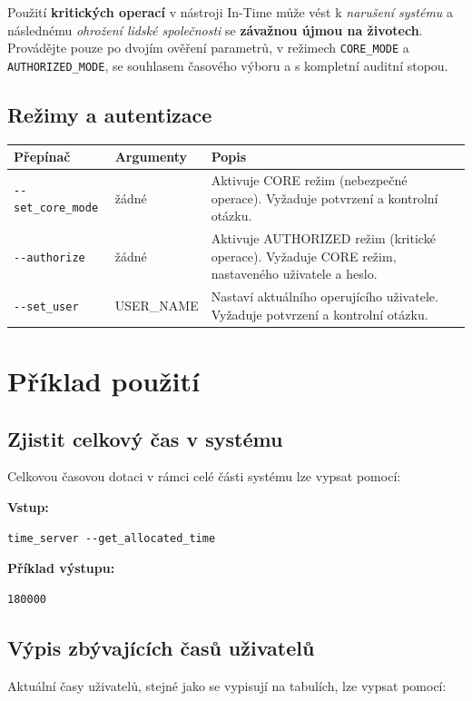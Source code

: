 \documentclass[11pt,a4paper]{book}
\begin{document}
\begin{caja}[title=Varování]
Použití \textbf{kritických operací} v nástroji In-Time může vést k \emph{narušení systému}
a následnému \emph{ohrožení lidské společnosti} se \textbf{závažnou újmou na životech}.
Provádějte pouze po dvojím ověření parametrů, v režimech \texttt{CORE\_MODE} a
\texttt{AUTHORIZED\_MODE}, se souhlasem časového výboru a s kompletní auditní stopou.
\end{caja}

\section{Režimy a autentizace}
\begin{longtable}{@{}llp{9cm}@{}}
\toprule
\textbf{Přepínač} & \textbf{Argumenty} & \textbf{Popis} \\
\midrule
\texttt{{-}-set\_core\_mode} & žádné & Aktivuje CORE režim (nebezpečné operace). Vyžaduje potvrzení a kontrolní otázku. \\
\texttt{{-}-authorize} & žádné & Aktivuje AUTHORIZED režim (kritické operace). Vyžaduje CORE režim, nastaveného uživatele a heslo. \\
\texttt{{-}-set\_user} & USER\_NAME & Nastaví aktuálního operujícího uživatele. Vyžaduje potvrzení a kontrolní otázku. \\
\bottomrule
\end{longtable}

\chapter{Příklad použití}

\section{Zjistit celkový čas v systému}
Celkovou časovou dotaci v rámci celé části systému lze vypsat pomocí:

\textbf{Vstup:}
\begin{verbatim}
time_server --get_allocated_time
\end{verbatim}

\textbf{Příklad výstupu:}
\begin{verbatim}
180000
\end{verbatim}

\section{Výpis zbývajících časů uživatelů}
Aktuální časy uživatelů, stejné jako se vypisují na tabulích, lze vypsat pomocí:
\end{document}
